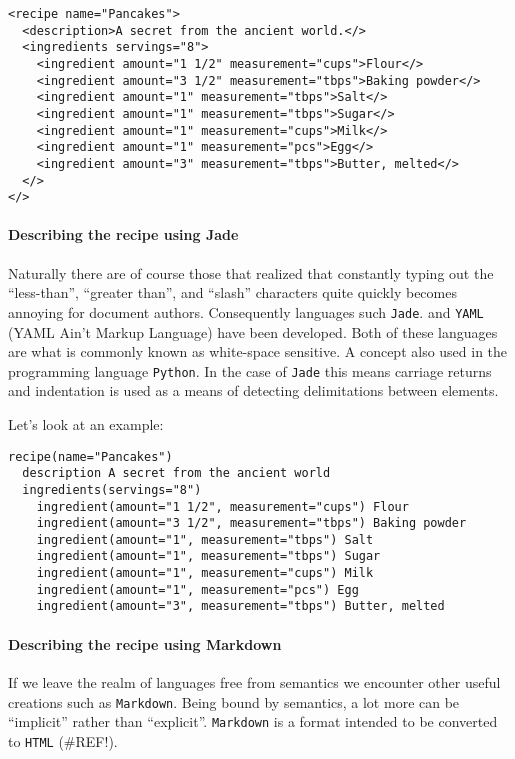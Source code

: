 \documentclass{scrreprt}
\begin{document}
\begin{lstlisting}
<recipe name="Pancakes">
  <description>A secret from the ancient world.</>
  <ingredients servings="8">
    <ingredient amount="1 1/2" measurement="cups">Flour</>
    <ingredient amount="3 1/2" measurement="tbps">Baking powder</>
    <ingredient amount="1" measurement="tbps">Salt</>
    <ingredient amount="1" measurement="tbps">Sugar</>
    <ingredient amount="1" measurement="cups">Milk</>
    <ingredient amount="1" measurement="pcs">Egg</>
    <ingredient amount="3" measurement="tbps">Butter, melted</>
  </>
</>
\end{lstlisting}



\paragraph{Describing the recipe using Jade}
Naturally there are of course those that realized that constantly typing out the ``less-than'', ``greater than'', and ``slash'' characters quite quickly becomes annoying for document authors. Consequently languages such \texttt{Jade}. and \texttt{YAML} (YAML Ain't Markup Language) have been developed. Both of these languages are what is commonly known as white-space sensitive. A concept also used in the programming language \texttt{Python}. In the case of \texttt{Jade} this means carriage returns and indentation is used as a means of detecting delimitations between elements.

Let's look at an example:

\begin{lstlisting}
recipe(name="Pancakes")
  description A secret from the ancient world
  ingredients(servings="8")
    ingredient(amount="1 1/2", measurement="cups") Flour
    ingredient(amount="3 1/2", measurement="tbps") Baking powder
    ingredient(amount="1", measurement="tbps") Salt
    ingredient(amount="1", measurement="tbps") Sugar
    ingredient(amount="1", measurement="cups") Milk
    ingredient(amount="1", measurement="pcs") Egg
    ingredient(amount="3", measurement="tbps") Butter, melted
\end{lstlisting}



\paragraph{Describing the recipe using Markdown}
If we leave the realm of languages free from semantics we encounter other useful creations such as \texttt{Markdown}. Being bound by semantics, a lot more can be ``implicit'' rather than ``explicit''. \texttt{Markdown} is a format intended to be converted to \texttt{HTML} (\#REF!).
\end{document}
